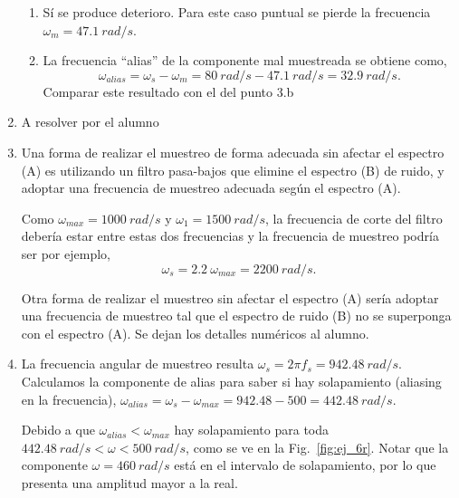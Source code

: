 \documentclass[10pt,a4paper]{article}
\begin{document}
\begin{enumerate}
\begin{enumerate}
\item
Sí se produce deterioro. Para este caso puntual se pierde la frecuencia $\omega_m=47.1~rad/s$.

\item
La frecuencia ``alias'' de la componente mal muestreada se obtiene como,
\begin{equation}
\omega_{alias}=\omega_s-\omega_m=80~rad/s-47.1~rad/s=32.9~rad/s.
\end{equation}
Comparar este resultado con el del punto 3.b
\end{enumerate}


\item A resolver por el alumno

\item
Una forma de realizar el muestreo de forma adecuada sin afectar el espectro (A) es utilizando un filtro pasa-bajos que elimine el espectro (B) de ruido, y adoptar una frecuencia de muestreo adecuada según el espectro (A). 

Como $\omega_{max} = 1000~rad/s$ y $\omega_1=1500~rad/s$, la frecuencia de corte del filtro debería estar entre estas dos frecuencias y la frecuencia de muestreo podría ser por ejemplo,
\begin{equation}
\omega_s = 2.2~\omega_{max} = 2200~rad/s.
\end{equation}

Otra forma de realizar el muestreo sin afectar el espectro (A) sería adoptar una frecuencia de muestreo tal que el espectro de ruido (B) no se superponga con el espectro (A). Se dejan los detalles numéricos al alumno.


\item La frecuencia angular de muestreo resulta $\omega_s=2\pi f_s=942.48 ~ rad/s$. Calculamos la componente de alias 
para saber si hay solapamiento (aliasing en la frecuencia), 
$\omega_{alias}=\omega_s-\omega_{max}=942.48-500=442.48~rad/s$. 

Debido a que $\omega_{alias}<\omega_{max}$ hay 
solapamiento para toda $442.48~rad/s<\omega<500~rad/s$, como se ve en la Fig.~\ref{fig:ej_6r}. Notar que la 
componente $\omega=460~rad/s$ está en el intervalo de solapamiento, por lo que presenta una amplitud mayor a la real.


\end{enumerate}
\end{document}
